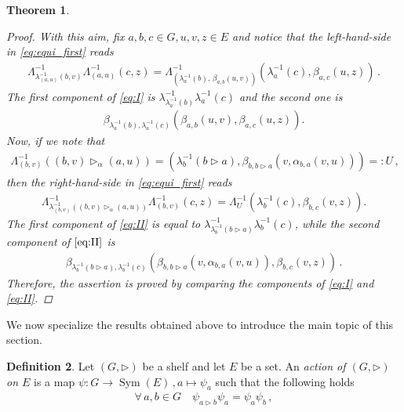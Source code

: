 \documentclass[preprint,1p]{elsarticle}
\numberwithin{equation}{section}
\newtheorem{theor}{Theorem}[section]
\theoremstyle{definition}               %
\newtheorem{defin}[theor]{Definition}
\newcommand{\tr}{\triangleright}
\DeclareMathOperator{\Sym}{Sym}
\DeclareMathOperator{\Map}{Map}
\begin{document}
\begin{theor}
\begin{proof}
    With this aim, fix $a,b,c \in G, u,v,z \in E$ and notice that the left-hand-side in \eqref{eq:equi_first} reads
    \begin{align}\label{eq:I}\tag{I}
        {\Lambda}^{-1}_{\lambda^{-1}_{(a,u)}(b,v)}{\Lambda}^{-1}_{(a,u)}(c,z)
        =
        {\Lambda}^{-1}_{\left(\lambda^{-1}_a(b),\,\beta_{a,b}(u,v)\right)}
        \left(\lambda^{-1}_a(c),\beta_{a,c}(u,z)\right) \,.
    \end{align}
    The first component of \eqref{eq:I} is 
    $\lambda^{-1}_{\lambda^{-1}_a(b)}\lambda^{-1}_a(c)$
    and the second one is
    \begin{align*}
        \beta_{\lambda^{-1}_a(b),\lambda^{-1}_a(c)}
        \left(\beta_{a,b}(u,v), \beta_{a,c}(u,z)\right).
    \end{align*}
    Now, if we note that 
    \begin{align*}
           {\Lambda}^{-1}_{(b,v)}\left((b,v) \tr_\alpha (a,u)\right) 
            =\left(\lambda^{-1}_b(b \tr a), \beta_{b,b \tr a}\left(v,\alpha_{b,a}(v,u)\right)\right)
            =: U \,,
    \end{align*}
    then the right-hand-side in \eqref{eq:equi_first} reads
    \begin{align}\label{eq:II}\tag{II}
        {\Lambda}^{-1}_{\lambda^{-1}_{(b,v)}\left((b,v) \tr_\alpha (a,u)\right)}{\Lambda}^{-1}_{(b,v)}(c,z)
        =
        {\Lambda}^{-1}_{U}
        \left(\lambda^{-1}_b(c),\beta_{b,c}(v,z)\right).
    \end{align}
    The first component of \eqref{eq:II} is equal to
    $\lambda^{-1}_{\lambda^{-1}_b\left(b\tr a\right)}
    \lambda^{-1}_b(c)$,
    while the second component of $\eqref{eq:II}$ is
    \begin{align*}
        \beta_{\lambda^{-1}_b(b \tr a),\lambda^{-1}_b(c)}
        \left(\beta_{b,b \tr a}\left(v,\alpha_{b,a}(v,u)\right),\beta_{b,c}(v,z)\right) \,.
    \end{align*}
    Therefore, the assertion is proved by comparing the components of \eqref{eq:I} and \eqref{eq:II}.
\end{proof}
\end{theor}

\bigskip

We now specialize the results obtained above to introduce the main topic of this section.

\begin{defin}
    Let $(G, \tr)$ be a shelf and let $E$ be a set.
    An \emph{action of $(G,\tr)$ on $E$} is a map $\psi:G \to \Sym(E) %
    \,, a \mapsto \psi_a$ such that the following holds
    \begin{align}\label{eq:shelf_action}
        \forall\, a,b \in G\quad \psi_{a \triangleright b}\psi_a = \psi_a \psi_b \,,
    \end{align}
\end{defin}
\end{document}
